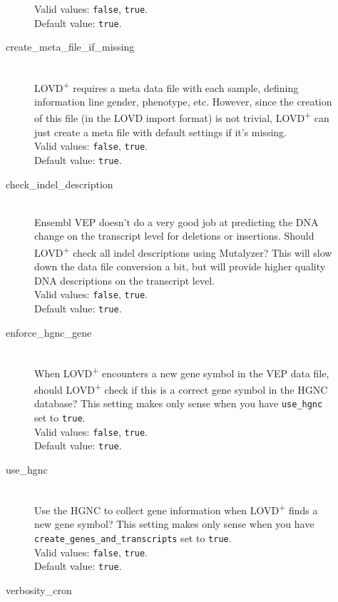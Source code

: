 \begin{description}
\begin{description}
      Valid values: \texttt{false}, \texttt{true}.\\
      Default value: \texttt{true}.
    \item[create\_meta\_file\_if\_missing] \hfill \\
      LOVD\textsuperscript{+} requires a meta data file with each sample,
       defining information line gender, phenotype, etc.
      However, since the creation of this file (in the LOVD import format) is not trivial,
       LOVD\textsuperscript{+} can just create a meta file with default settings if it's missing.\\
      Valid values: \texttt{false}, \texttt{true}.\\
      Default value: \texttt{true}.
    \item[check\_indel\_description] \hfill \\
      Ensembl VEP doesn't do a very good job at predicting the DNA change
       on the transcript level for deletions or insertions.
      Should LOVD\textsuperscript{+} check all indel descriptions using Mutalyzer?
      This will slow down the data file conversion a bit,
       but will provide higher quality DNA descriptions on the transcript level.\\
      Valid values: \texttt{false}, \texttt{true}.\\
      Default value: \texttt{true}.
    \clearpage %
    \item[enforce\_hgnc\_gene] \hfill \\
      When LOVD\textsuperscript{+} encounters a new gene symbol in the VEP data file,
       should LOVD\textsuperscript{+} check if this is a correct gene symbol in the HGNC database?
      This setting makes only sense when you have \texttt{use\_hgnc} set to \texttt{true}.\\
      Valid values: \texttt{false}, \texttt{true}.\\
      Default value: \texttt{true}.
    \item[use\_hgnc] \hfill \\
      Use the HGNC to collect gene information when LOVD\textsuperscript{+} finds a new gene symbol?
      This setting makes only sense when you have \texttt{create\_genes\_and\_transcripts} set to \texttt{true}.\\
      Valid values: \texttt{false}, \texttt{true}.\\
      Default value: \texttt{true}.
    \item[verbosity\_cron] \hfill \\

\end{description}
\end{description}
